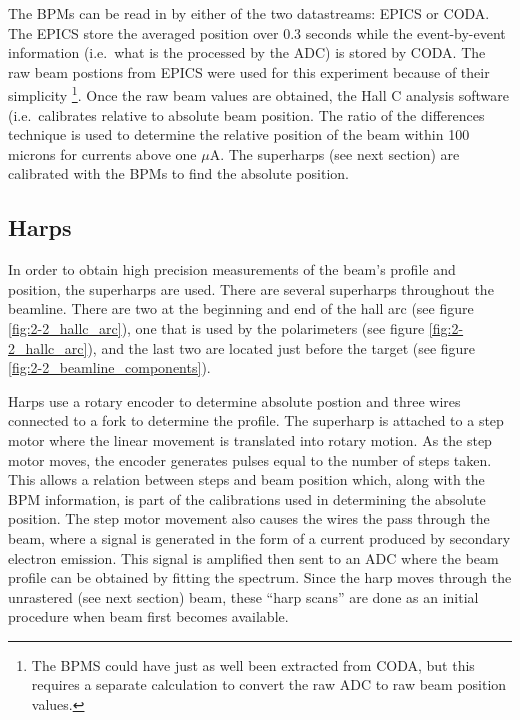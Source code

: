 \documentclass[
]{report}
\begin{document}


The BPMs can be read in by either of the two datastreams: EPICS or CODA.
The EPICS store the averaged position over 0.3 seconds while the
event-by-event information (i.e.~what is the processed by the ADC) is
stored by CODA. The raw beam postions from EPICS were used for this
experiment because of their simplicity
\footnote{The BPMS could have just as well been extracted from CODA, but this requires a separate calculation to convert the raw ADC to raw beam position values.}.
Once the raw beam values are obtained, the Hall C analysis software
(i.e.~calibrates relative to absolute beam position. The ratio of the
differences technique is used to determine the relative position of the
beam within 100 microns for currents above one \(\mu\)A. The superharps
(see next section) are calibrated with the BPMs to find the absolute
position.



\hypertarget{harps}{%
\subsection{Harps}\label{harps}}

In order to obtain high precision measurements of the beam's profile and
position, the superharps are used. There are several superharps
throughout the beamline. There are two at the beginning and end of the
hall arc (see figure \ref{fig:2-2_hallc_arc}), one that is used by the
polarimeters (see figure \ref{fig:2-2_hallc_arc}), and the last two are
located just before the target (see figure
\ref{fig:2-2_beamline_components}).

Harps use a rotary encoder to determine absolute postion and three wires
connected to a fork to determine the profile. The superharp is attached
to a step motor where the linear movement is translated into rotary
motion. As the step motor moves, the encoder generates pulses equal to
the number of steps taken. This allows a relation between steps and beam
position which, along with the BPM information, is part of the
calibrations used in determining the absolute position. The step motor
movement also causes the wires the pass through the beam, where a signal
is generated in the form of a current produced by secondary electron
emission. This signal is amplified then sent to an ADC where the beam
profile can be obtained by fitting the spectrum. Since the harp moves
through the unrastered (see next section) beam, these ``harp scans'' are
done as an initial procedure when beam first becomes available.
\end{document}
